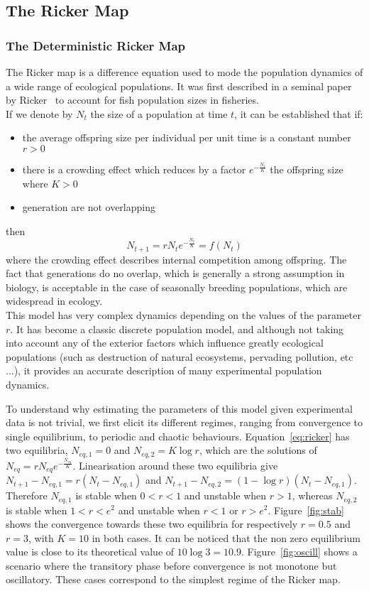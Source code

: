 \documentclass[12pt]{article}
\begin{document}
	\subsection{The Ricker Map}  \label{rickerGen}
	\subsubsection{The Deterministic Ricker Map}
	The Ricker map is a difference equation used to mode the population dynamics of a wide range of ecological populations. It was first described in a seminal paper by Ricker~\cite{Ricker1954} to account for fish population sizes in fisheries. \\
	If we denote by $N_t$ the size of a population at time $t$, it can be established that if:
	\begin{itemize}
	\item the average offspring size per individual per unit time is a constant number $r > 0$
	\item there is a crowding effect which reduces by a factor $e^{-\frac{N_t}{K}}$ the offspring size where $K > 0$
	\item generation are not overlapping
	\end{itemize}
	then 
	\begin{equation} 
	N_{t+1} = r N_t e^{-\frac{N_t}{K}} = f(N_t)
	\label{eq:ricker}
	\end{equation}
	where the crowding effect describes internal competition among offspring.
	The fact that generations do no overlap, which is generally a strong assumption in biology, is acceptable in the case of seasonally breeding populations, which are widespread in ecology. \\
	This model has very complex dynamics depending on the values of the parameter $r$. It has become a classic discrete population model, and although not taking into account any of the exterior factors which influence greatly ecological populations (such as destruction of natural ecosystems, pervading pollution, etc ...), it provides an accurate description of many experimental population dynamics.
	
	To understand why estimating the parameters of this model given experimental data is not trivial, we first elicit its different regimes, ranging from convergence to single equilibrium, to periodic and  chaotic behaviours. Equation~\ref{eq:ricker} has two equilibria, $N_{eq, 1} = 0$ and $N_{eq, 2} = K\log r$, which are the solutions of  $N_{eq} = r N_{eq} e^{-\frac{N_{eq}}{K}}$. Linearisation around these two equilibria give $N_{t+1} - N_{eq, 1} = r(N_{t} - N_{eq, 1})$ and $N_{t+1} - N_{eq, 2} = (1-\log r)(N_{t} - N_{eq, 1})$. Therefore $N_{eq, 1}$ is stable when $0 < r < 1$ and unstable when $r > 1$, whereas $N_{eq, 2}$ is stable when $1 < r < e^2$ and unstable when $r < 1$ or $r > e^2$. Figure~\ref{fig:stab} shows the convergence towards these two equilibria for respectively $r=0.5$ and $r=3$, with $K=10$ in both cases. It can be noticed that the non zero equilibrium value is close to its theoretical value of $10 \log 3 = 10.9$.  Figure~\ref{fig:oscill} shows a scenario where the transitory phase before convergence is not monotone but oscillatory. These cases correspond to the simplest regime of the Ricker map.
\end{document}
